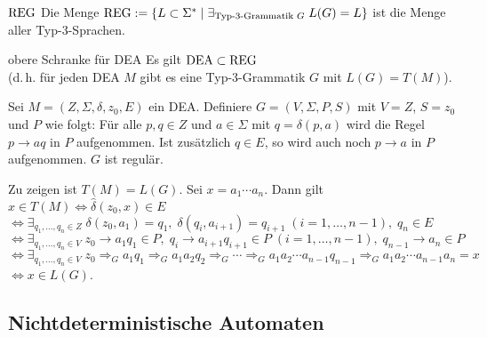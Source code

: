 \begin{Def}{$\text{REG}$}
    Die Menge $\text{REG} := \{L \subset \Sigma^\ast \;|\;
    \exists_{\text{Typ-3-Grammatik } G}\; L(G) = L\}$
    ist die Menge aller Typ-3-Sprachen.
\end{Def}

\begin{Satz}{obere Schranke für DEA}
    Es gilt $\text{DEA} \subset \text{REG}$\\
    (d.\,h. für jeden DEA $M$ gibt es eine Typ-3-Grammatik
    $G$ mit $L(G) = T(M)$).
\end{Satz}

\begin{Beweis}
    Sei $M = (Z, \Sigma, \delta, z_0, E)$ ein DEA.
    Definiere $G = (V, \Sigma, P, S)$ mit $V = Z$, $S = z_0$ und $P$ wie folgt:
    Für alle $p, q \in Z$ und $a \in \Sigma$ mit $q = \delta(p, a)$ wird
    die Regel $p \rightarrow aq$ in $P$ aufgenommen.
    Ist zusätzlich $q \in E$, so wird auch noch $p \rightarrow a$ in $P$
    aufgenommen.
    $G$ ist regulär.

    Zu zeigen ist $T(M) = L(G)$.
    Sei $x = a_1 \dotsb a_n$. Dann gilt
    $x \in T(M)
    \iff \widehat{\delta}(z_0, x) \in E$\\
    $\iff \exists_{q_1, \dotsc, q_n \in Z}\; \delta(z_0, a_1) = q_1,\;
    \delta(q_i, a_{i+1}) = q_{i+1}\; (i = 1, \dotsc, n - 1),\;
    q_n \in E$\\
    $\iff \exists_{q_1, \dotsc, q_n \in V}\; z_0 \rightarrow a_1 q_1 \in P,\;
    q_i \rightarrow a_{i+1} q_{i+1} \in P\; (i = 1, \dotsc, n - 1),\;
    q_{n-1} \rightarrow a_n \in P$\\
    $\iff \exists_{q_1, \dotsc, q_n \in V}\;
    z_0 \Rightarrow_G a_1 q_1 \Rightarrow_G a_1 a_2 q_2 \Rightarrow_G
    \dotsb \Rightarrow_G a_1 a_2 \dotsb a_{n-1} q_{n-1} \Rightarrow_G
    a_1 a_2 \dotsb a_{n-1} a_n = x$\\
    $\iff x \in L(G)$.
\end{Beweis}

\subsection{%
    Nichtdeterministische Automaten%
}

